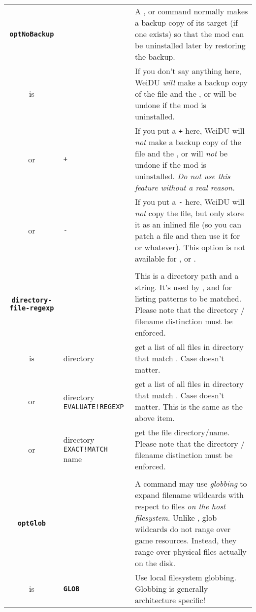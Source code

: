 \documentclass{article}
\def\ttref#1{\ahrefloc{#1}{\tt #1}}
\def\DEFINE#1{{\tt \bf #1}\label{#1}\index{#1}}
\def\t#1{{\tt #1}}
\begin{document}
\begin{tabular}{cp{10in}|p{10in}}
\\

\DEFINE{optNoBackup} & &
  A \ttref{COPY}, \ttref{MOVE} or \ttref{DELETE} command normally makes a backup copy of its target (if one
  exists) so that the mod can be uninstalled later by restoring the backup.
  \\

  is &   & If you don't say anything here, WeiDU {\em will} make a backup
           copy of the file and the \ttref{COPY}, \ttref{MOVE} or \ttref{DELETE} will be undone if the mod
           is uninstalled. \\
  or & \t{+} & If you put a \t{+} here, WeiDU will {\em not} make a backup
           copy of the file and the \ttref{COPY}, \ttref{MOVE} or \ttref{DELETE} will {\em not} be
           undone if the mod is uninstalled. {\em Do not use this feature without
			a real reason.} \\
  or & \t{-} & If you put a \t{-} here, WeiDU will {\em not} copy the file,
           but only store it as an inlined file (so you can patch a file and
           then use it for \ttref{EXTEND!BOTTOM} or whatever).
           This option is not available for \ttref{COPY!LARGE}, \ttref{MOVE} or \ttref{DELETE}. \\
\\

\DEFINE{directory-file-regexp} & & This is a directory path and a \ttref{regexp} string.
It's used by \ttref{MAKE!BIFF}, \ttref{ACTION!BASH!FOR} and \ttref{PATCH!BASH!FOR}
for listing patterns to be matched. Please note that
the directory / filename distinction must be enforced. \\
is & directory \ttref{regexp} & get a list of all files in directory that match \ttref{regexp}.
Case doesn't matter. \\
or & directory \t{EVALUATE!REGEXP} \ttref{regexp} & get a list of all files in directory that match \ttref{regexp}.
Case doesn't matter. This is the same as the above item. \\
or & directory \t{EXACT!MATCH} name & get the file directory/name. Please note that
the directory / filename distinction must be enforced. \\

\\
\DEFINE{optGlob} & &
  A \ttref{COPY} command may use \emph{globbing} to expand filename
  wildcards with respect to files \emph{on the host filesystem}. Unlike
  \ttref{COPY!EXISTING!REGEXP}, glob wildcards do not range over game
  resources. Instead, they range over physical files actually on the disk.
  \\
  is & \DEFINE{GLOB} & Use local filesystem globbing. Globbing is
  generally architecture specific!


\end{tabular}
\end{document}
